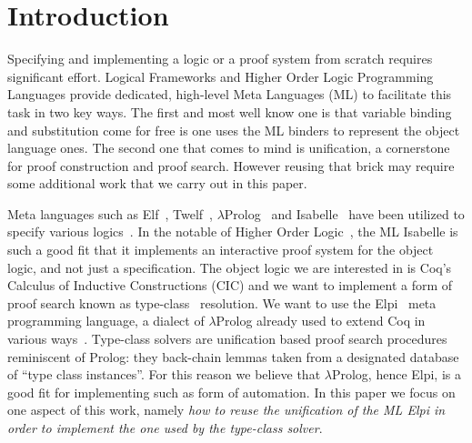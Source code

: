 \documentclass[sigconf,natbib=false,review]{acmart}
\begin{document}

\maketitle

\section{Introduction}
\label{sec:intro}

Specifying and implementing a logic or a proof system from scratch requires
significant effort.
Logical Frameworks and Higher Order Logic Programming Languages provide
dedicated, high-level Meta Languages (ML) to facilitate this task in two
key ways. The first and most well know one is that variable binding and
substitution come for free is one uses the ML binders to represent the object
language ones. The second one that comes to mind is unification, a cornerstone
for proof construction and proof search. However reusing that brick may require
some additional work that we carry out in this paper.

Meta languages such as Elf~\cite{elf}, Twelf~\cite{twelf},
$\lambda$Prolog~\cite{miller_nadathur_2012} and
Isabelle~\cite{10.1007/978-3-540-71067-7_7}
have been utilized to specify various
logics~\cite{felty88cade,books/sp/NipkowPW02,10.1007/BF00881873,felty93lics}.
In the notable of Higher Order Logic~\cite{books/sp/NipkowPW02},
the ML Isabelle is such a good fit that it implements an interactive proof
system for the object logic, and not just a specification.
The object logic we are interested in is Coq's~\cite{Coq-refman}
Calculus of Inductive Constructions (CIC) and we want to implement a
form of proof search known as type-class~\cite{wadler89,sozeau08} resolution.
We want to use the Elpi~\cite{tassi:hal-01637063} meta programming language,
a dialect of $\lambda$Prolog already used to extend
Coq in various ways~\cite{tassi:hal-01637063,tassi:hal-01897468,gregoire:hal-03800154,newtc}.
Type-class solvers are unification based proof search procedures
reminiscent of Prolog: they back-chain lemmas taken
from a designated database of ``type class instances''.
For this reason we believe that $\lambda$Prolog, hence Elpi, is a good fit for
implementing such as form of automation. In this paper we focus on one aspect of
this work, namely \emph{how to reuse the unification of the ML Elpi in order to
implement the one used by the type-class solver}.
\end{document}
